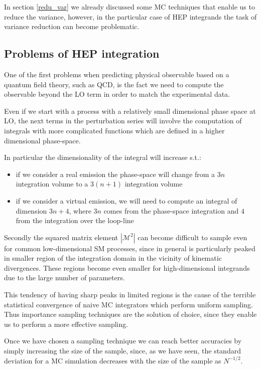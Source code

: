 \documentclass[../main/main.tex]{subfiles}
\begin{document}
In section \ref{redu_var} we already discussed some MC techniques that enable us to reduce the variance, however, in the particular case of HEP integrands the task of variance reduction can become problematic.

\subsection{Problems of HEP integration}
One of the first problems when predicting physical observable based on a quantum field theory, such as QCD, is the fact we need to compute the observable beyond the LO term in order to match the experimental data. 

Even if we start with a process with a relatively small dimensional phase space  at LO, the next terms in the perturbation series will involve the computation of integrals with more complicated functions which are defined in a higher dimensional phase-space.

In particular the dimensionality of the integral will increase s.t.:
\begin{itemize}
	\item if we consider a real emission  the phase-space will change from a $3 n$ integration volume to a $3(n+1)$ integration volume
	\item if we consider a virtual emission, we will need to compute an integral of dimension $3n +4$, where $3n$ comes from the phase-space integration and $4$ from the integration over the loop-line
\end{itemize}

Secondly the squared matrix element $|\mathcal{M}^2|$ can become difficult to sample even for common low-dimensional SM processes, since 
in general is particularly peaked in smaller region of the integration domain in the vicinity of kinematic divergences. These regions become even smaller for high-dimensional integrands due to the large number of parameters.

This tendency of having sharp peaks in limited regions is the cause of the terrible statistical convergence of naive MC integrators which 
perform uniform sampling. Thus importance sampling techniques are the solution of choice, since they enable us to perform a more effective 
sampling.

Once we have chosen a sampling technique we can reach better accuracies by simply increasing the size of the sample, since, as we have seen, the 
standard deviation for a MC simulation decreases with the size of the sample as $N^{-1/2}$.
\end{document}
